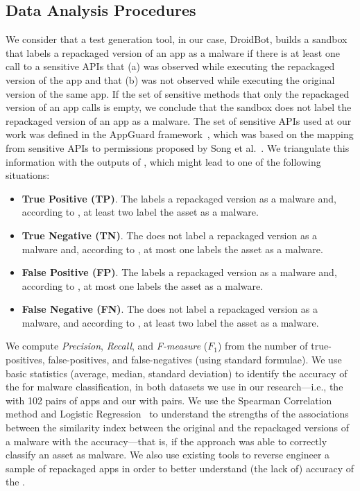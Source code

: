 \subsection{Data Analysis Procedures} \label{sec:dataAnalysisProc}



We consider that a test
generation tool, in our case, DroidBot, builds a sandbox that labels a repackaged version
of an app as a malware if there is at least one call to a sensitive APIs that (a) was observed
while executing the repackaged version of the app and that (b) was not observed while
executing the original version of the same app. If the set of sensitive methods that only the repackaged version of an app calls is empty,
we conclude that the sandbox does not label the repackaged version of an app as a malware. The set of sensitive APIs used at our work was defined in the AppGuard framework~\cite{DBLP:conf/esorics/BackesGHMS13}, which was based on the mapping from sensitive APIs to permissions proposed by Song et al.~\cite{DBLP:conf/ccs/FeltCHSW11}. We triangulate
this information with the outputs of \vt, which might lead to one of the following
situations:

\begin{itemize}
\item {\bf True Positive (TP)}. The \mas labels a repackaged version as a malware and, according to
  \vt, at least two \ses label the asset as a malware.
  
\item {\bf True Negative (TN)}. The \mas does not label a repackaged version as a malware and,
  according to \vt, at most one \se labels the asset as a malware. 

\item {\bf False Positive (FP)}. The \mas labels a repackaged version as a malware and, according to
  \vt, at most one \se labels the asset as a malware.

\item {\bf False Negative (FN)}. The \mas does not label a repackaged version as a malware, and
  according to \vt, at least two \ses label the asset as a malware.
\end{itemize}

We compute \emph{Precision}, \emph{Recall}, and \emph{F-measure} ($F_1$) from
the number of true-positives, false-positives, and false-negatives (using standard
formulae). We use basic statistics (average, median, standard deviation) to identify the
accuracy of the \mas for malware classification, in both
datasets we use in our research---i.e., the \sds
with 102 pairs of apps and our \cds with
\apps pairs. We use the Spearman Correlation~\cite{spearman-correlation} method and
Logistic Regression~\cite{statistical-learning} to understand the strengths of
the associations between the similarity index between the original and the repackaged versions
of a malware with the \mas accuracy---that is,
if the approach was able to correctly classify an asset as malware. We also use existing tools to reverse engineer a sample of repackaged
apps in order to better understand (the lack of) accuracy
of the \mas.



